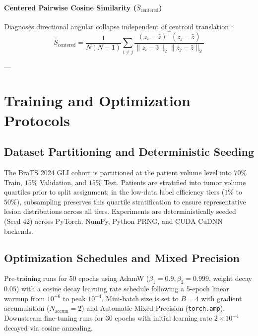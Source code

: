 \documentclass{article}
\begin{document}
\paragraph{Centered Pairwise Cosine Similarity ($\bar{S}_{\text{centered}}$)}
Diagnoses directional angular collapse independent of centroid translation \citep{wang2020understanding}:
\begin{equation}
    \bar{S}_{\text{centered}} = \frac{1}{N(N-1)} \sum_{i \neq j} \frac{(z_i - \bar{z})^\top (z_j - \bar{z})}{\|z_i - \bar{z}\|_2 \|z_j - \bar{z}\|_2}
\end{equation}

---

\section{Training and Optimization Protocols}

\subsection{Dataset Partitioning and Deterministic Seeding}
The BraTS 2024 GLI cohort is partitioned at the patient volume level into $70\%$ Train, $15\%$ Validation, and $15\%$ Test. Patients are stratified into tumor volume quartiles prior to split assignment; in the low-data label efficiency tiers ($1\%$ to $50\%$), subsampling preserves this quartile stratification to ensure representative lesion distributions across all tiers. Experiments are deterministically seeded (Seed 42) across PyTorch, NumPy, Python PRNG, and CUDA CuDNN backends.

\subsection{Optimization Schedules and Mixed Precision}
Pre-training runs for 50 epochs using AdamW ($\beta_1 = 0.9, \beta_2 = 0.999$, weight decay $0.05$) with a cosine decay learning rate schedule following a 5-epoch linear warmup from $10^{-6}$ to peak $10^{-4}$. Mini-batch size is set to $B=4$ with gradient accumulation ($N_{\text{accum}}=2$) and Automatic Mixed Precision (\texttt{torch.amp}). Downstream fine-tuning runs for 30 epochs with initial learning rate $2 \times 10^{-4}$ decayed via cosine annealing.
\end{document}
